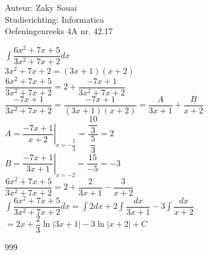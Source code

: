 \documentclass[a4paper]{article}
\begin{document}
  
\noindent \large Auteur: Zaky Souai \\
\noindent \large Studierichting:  Informatica\\
\noindent \large Oefeningenreeks 4A nr. 42.17\\

\bigskip

\normalsize

$\displaystyle \int \dfrac{6x^2+7x+5}{3x^2+7x+2} dx$\\

$3x^2+7x+2=(3x+1)(x+2)$\\

$\dfrac{6x^2+7x+5}{3x^2+7x+2}=2 + \dfrac{-7x+1}{3x^2+7x+2}$\\

$\dfrac{-7x+1}{3x^2+7x+2}= \dfrac{-7x+1}{(3x+1)(x+2)} = \dfrac{A}{3x+1}+ \dfrac{B}{x+2}$\\

$A=\left.\dfrac{-7x+1}{x+2}\right|_{x=-\dfrac{1}{3}}=\dfrac{\dfrac{10}{3}}{\dfrac{5}{3}}=2$\\

$B=\left.\dfrac{-7x+1}{3x+1}\right|_{x=-2}=\dfrac{15}{-5}=-3$\\

$\dfrac{6x^2+7x+5}{3x^2+7x+2}=2+\dfrac{2}{3x+1}-\dfrac{3}{x+2}$\\

$\displaystyle \int \dfrac{6x^2+7x+5}{3x^2+7x+2} dx = \displaystyle \int 2 dx + 2 \displaystyle \int\dfrac{dx}{3x+1} - 3 \displaystyle \int\dfrac{dx}{x+2}$\\

$=2x+\dfrac{2}{3}\ln|3x+1|-3\ln|x+2|+C$


\begin{thebibliography}{999}
\end{thebibliography}
\end{document}
